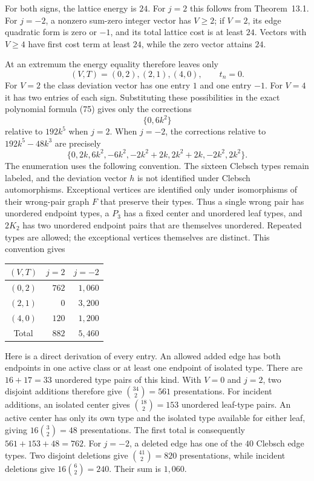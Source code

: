 \documentclass[11pt]{amsart}
\theoremstyle{definition}
\theoremstyle{remark}
\begin{document}
For both signs, the lattice energy is $24$. For $j=2$ this follows from
Theorem~13.1. For $j=-2$, a nonzero sum-zero integer vector has $V\geq2$;
if $V=2$, its edge quadratic form is zero or $-1$, and its total lattice
cost is at least $24$. Vectors with $V\geq4$ have first cost term at
least $24$, while the zero vector attains $24$.

At an extremum the energy equality therefore leaves only
\[
 (V,T)=(0,2),(2,1),(4,0),\qquad t_n=0.
\]
For $V=2$ the class deviation vector has one entry $1$ and one entry
$-1$. For $V=4$ it has two entries of each sign. Substituting these
possibilities in the exact polynomial formula (75) gives only the
corrections
\[
 \{0,6k^2\}
\]
relative to $192k^5$ when $j=2$. When $j=-2$, the corrections relative
to $192k^5-48k^3$ are precisely
\[
 \{0,2k,6k^2,-6k^2,-2k^2+2k,2k^2+2k,-2k^2,2k^2\}.
\]
The enumeration uses the following convention. The sixteen Clebsch types
remain labeled, and the deviation vector $h$ is not identified under
Clebsch automorphisms. Exceptional vertices are identified only under
isomorphisms of their wrong-pair graph $F$ that preserve their types.
Thus a single wrong pair has unordered endpoint types, a $P_3$ has a
fixed center and unordered leaf types, and $2K_2$ has two unordered
endpoint pairs that are themselves unordered. Repeated types are allowed;
the exceptional vertices themselves are distinct. This convention gives
\begin{center}
\begin{tabular}{crr}
\toprule
$(V,T)$ & $j=2$ & $j=-2$\\
\midrule
$(0,2)$ & $762$ & $1,060$\\
$(2,1)$ & $0$ & $3,200$\\
$(4,0)$ & $120$ & $1,200$\\
\midrule
Total & $882$ & $5,460$\\
\bottomrule
\end{tabular}
\end{center}

Here is a direct derivation of every entry. An allowed added edge has
both endpoints in one active class or at least one endpoint of isolated
type. There are $16+17=33$ unordered type pairs of this kind. With $V=0$
and $j=2$, two disjoint additions therefore give $\binom{34}{2}=561$
presentations. For incident additions, an isolated center gives
$\binom{18}{2}=153$ unordered leaf-type pairs. An active center has only
its own type and the isolated type available for either leaf, giving
$16\binom{3}{2}=48$ presentations. The first total is consequently
$561+153+48=762$.
For $j=-2$, a deleted edge has one of the $40$ Clebsch edge types.
Two disjoint deletions give $\binom{41}{2}=820$ presentations, while
incident deletions give $16\binom{6}{2}=240$. Their sum is $1,060$.
\end{document}
